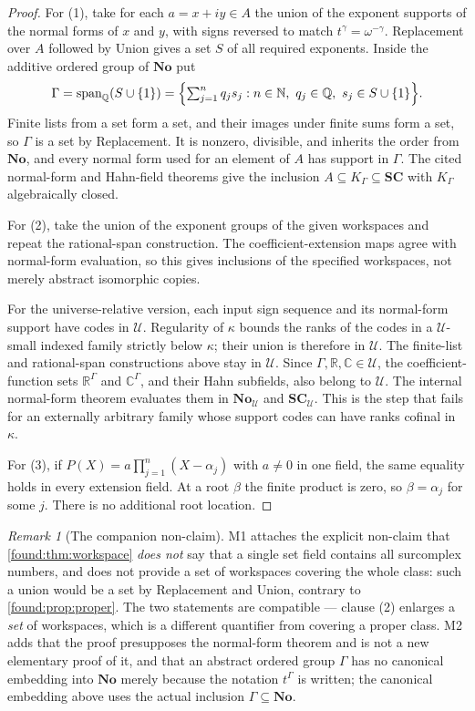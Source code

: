 \documentclass[11pt,letterpaper]{article}
\numberwithin{equation}{section}
\theoremstyle{definition}
\theoremstyle{remark}
\newtheorem{remark}[theorem]{Remark}
\newcommand{\No}{\mathbf{No}}
\newcommand{\SC}{\mathbf{SC}}
\newcommand{\R}{\mathbb R}
\newcommand{\C}{\mathbb C}
\newcommand{\N}{\mathbb N}
\newcommand{\Q}{\mathbb Q}
\newcommand{\U}{\mathcal U}
\begin{document}
\begin{proof}
For (1), take for each $a=x+iy\in A$ the union of the exponent supports of the
normal forms of $x$ and $y$, with signs reversed to match
$t^\gamma=\omega^{-\gamma}$. Replacement over $A$ followed by Union gives a set
$S$ of all required exponents. Inside the additive ordered group of $\No$ put
\[
 \Gamma=\operatorname{span}_\Q(S\cup\{1\})
 =\Bigl\{\textstyle\sum_{j=1}^{n}q_js_j:n\in\N,\ q_j\in\Q,\
 s_j\in S\cup\{1\}\Bigr\}.
\]
Finite lists from a set form a set, and their images under finite sums form a
set, so $\Gamma$ is a set by Replacement. It is nonzero, divisible, and inherits
the order from $\No$, and every normal form used for an element of $A$ has
support in $\Gamma$. The cited normal-form and Hahn-field theorems give the
inclusion $A\subseteq K_\Gamma\subseteq\SC$ with $K_\Gamma$ algebraically
closed.

For (2), take the union of the exponent groups of the given workspaces and
repeat the rational-span construction. The coefficient-extension maps agree
with normal-form evaluation, so this gives inclusions of the specified
workspaces, not merely abstract isomorphic copies.

For the universe-relative version, each input sign sequence and its normal-form
support have codes in $\U$. Regularity of $\kappa$ bounds the ranks of the
codes in a $\U$-small indexed family strictly below $\kappa$; their union is
therefore in $\U$. The finite-list and rational-span constructions above stay
in $\U$. Since $\Gamma,\R,\C\in\U$, the coefficient-function sets
$\R^\Gamma$ and $\C^\Gamma$, and their Hahn subfields, also belong to $\U$.
The internal normal-form theorem evaluates them in $\No_\U$ and $\SC_\U$.
This is the step that fails for an externally arbitrary family whose support
codes can have ranks cofinal in $\kappa$.

For (3), if $P(X)=a\prod_{j=1}^{n}(X-\alpha_j)$ with $a\ne0$ in one field, the
same equality holds in every extension field. At a root $\beta$ the finite
product is zero, so $\beta=\alpha_j$ for some $j$. There is no additional root
location.
\end{proof}

\begin{remark}[The companion non-claim]\label{found:rem:nocover}
M1 attaches the explicit non-claim that \cref{found:thm:workspace} \emph{does
not} say that a single set field contains all surcomplex numbers, and does not
provide a set of workspaces covering the whole class: such a union would be a
set by Replacement and Union, contrary to \cref{found:prop:proper}. The two
statements are compatible --- clause (2) enlarges a \emph{set} of workspaces,
which is a different quantifier from covering a proper class. M2 adds that the
proof presupposes the normal-form theorem and is not a new elementary proof of
it, and that an abstract ordered group $\Gamma$ has no canonical embedding into
$\No$ merely because the notation $t^\Gamma$ is written; the canonical embedding
above uses the actual inclusion $\Gamma\subseteq\No$.
\end{remark}
\end{document}
